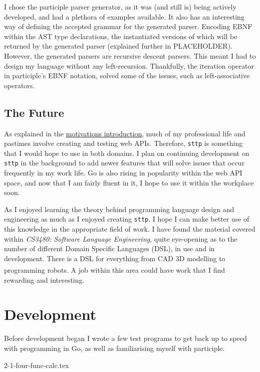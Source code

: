 \documentclass[]{full}
\theoremstyle{definition}
\begin{document}
I chose the participle parser generator, as it was (and still is) being actively developed, and had a plethora of examples available. It also has an interesting way of defining the accepted grammar for the generated parser. Encoding EBNF within the AST type declarations, the instantiated versions of which will be returned by the generated parser (explained further in PLACEHOLDER). However, the generated parsers are recursive descent parsers. This meant I had to design my language without any left-recursion. Thankfully, the iteration operator in participle's EBNF notation, solved some of the issues, such as left-associative operators.

\section{The Future}

As explained in the \hyperref[chap:motivations]{motivations introduction}, much of my professional life and pastimes involve creating and testing web APIs. Therefore, \verb|sttp| is something that I would hope to use in both domains. I plan on continuing development on \verb|sttp| in the background to add newer features that will solve issues that occur frequently in my work life. Go is also rising in popularity within the web API space, and now that I am fairly fluent in it, I hope to use it within the workplace soon.

As I enjoyed learning the theory behind programming language design and engineering as much as I enjoyed creating \verb|sttp|. I hope I can make better use of this knowledge in the appropriate field of work. I have found the material covered within \textit{CS3480: Software Language Engineering}, quite eye-opening as to the number of different Domain Specific Languages (DSL), in use and in development. There is a DSL for everything from CAD 3D modelling to programming robots\textsuperscript{\cite{nordmann_hochgeschwender_wrede_2014}}. A job within this area could have work that I find rewarding and interesting.

\chapter{Development}
\label{chap:development}

Before development began I wrote a few test programs to get back up to speed with programming in Go, as well as familiarising myself with participle.

{2-1-four-func-calc.tex}
\end{document}
